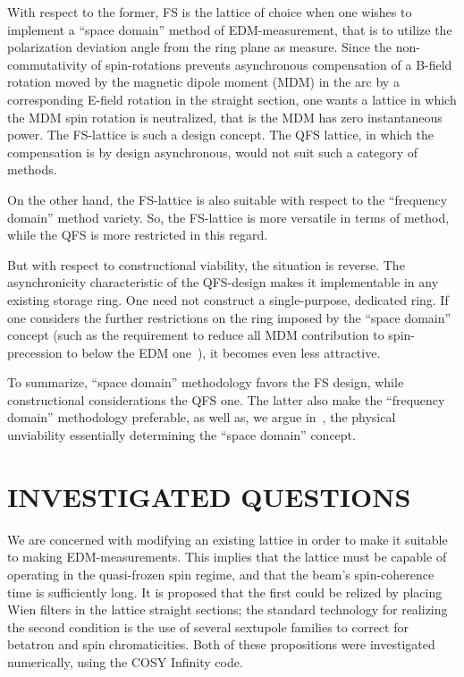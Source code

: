 \documentclass[a4paper]{jacow}
\begin{document}
With respect to the former, FS is the lattice of choice when one wishes to implement a ``space domain'' method of EDM-measurement, that is to utilize the polarization deviation angle from the ring plane as measure. Since the non-commutativity of spin-rotations prevents asynchronous compensation of a B-field rotation moved by the magnetic dipole moment (MDM) in the arc by a corresponding E-field rotation in the straight section, one wants a lattice in which the MDM spin rotation is neutralized, that is the MDM has zero instantaneous power. The FS-lattice is such a design concept. The QFS lattice, in which the compensation is by design asynchronous, would not suit such a category of methods.

On the other hand, the FS-lattice is also suitable with respect to the ``frequency domain'' method variety. So, the FS-lattice is more versatile in terms of method, while the QFS is more restricted in this regard.

But with respect to constructional viability, the situation is reverse. The asynchronicity characteristic of the QFS-design makes it implementable in any existing storage ring. One need not construct a single-purpose, dedicated ring. If one considers the further restrictions on the ring imposed by the ``space domain'' concept (such as the requirement to reduce all MDM contribution to spin-precession to below the EDM one~\cite{Senichev-FDM}), it becomes even less attractive.

To summarize, ``space domain'' methodology favors the FS design, while constructional considerations the QFS one. The latter also make the ``frequency domain'' methodology preferable, as well as, we argue in~\cite{Senichev-FDM}, the physical unviability essentially determining the ``space domain'' concept.

\section{INVESTIGATED QUESTIONS}

We are concerned with modifying an existing lattice in order to make it suitable to making EDM-measurements. This implies that the lattice must be capable of operating in the quasi-frozen spin regime, and that the beam's spin-coherence time is sufficiently long. It is proposed that the first could be relized by placing Wien filters in the lattice straight sections; the standard technology for realizing the second condition is the use of several sextupole families to correct for betatron and spin chromaticities. Both of these propositions were investigated numerically, using the COSY Infinity code.~\cite{COSY-Infinity}
\end{document}
